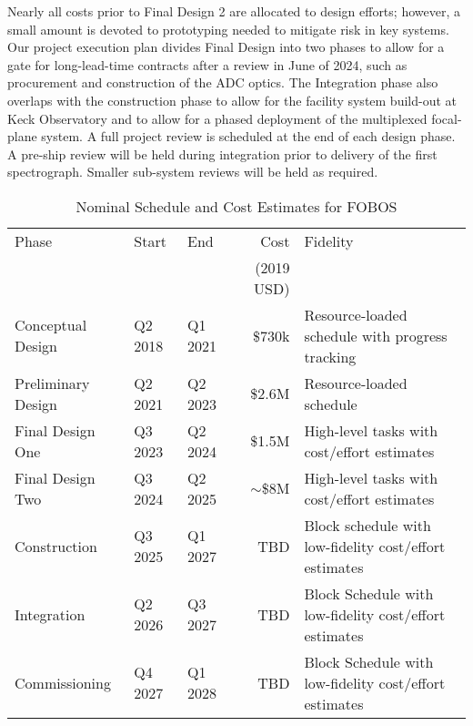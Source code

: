 Nearly all costs prior to Final Design 2 are allocated to design
efforts; however, a small amount is devoted to prototyping needed to
mitigate risk in key systems.  Our project execution plan divides Final
Design into two phases to allow for a gate for long-lead-time contracts
after a review in June of 2024, such as procurement and construction of
the ADC optics.  The Integration phase also overlaps with the
construction phase to allow for the facility system build-out at Keck
Observatory and to allow for a phased deployment of the multiplexed
focal-plane system.  A full project review is scheduled at the end of
each design phase.  A pre-ship review will be held during integration
prior to delivery of the first spectrograph.   Smaller sub-system
reviews will be held as required.

\begin{table}[h!]
\centering
\footnotesize
\caption{Nominal Schedule and Cost Estimates for FOBOS}
\label{tab:cost}
\vspace*{-10pt}
\begin{tabular}{l | l l r l }
\hline
Phase              &  Start  &     End &         Cost & Fidelity \\
                   &         &         &  (2019 USD) &  \\
\hline
\hline
Conceptual Design  & Q2 2018 & Q1 2021 &   \$730k & Resource-loaded schedule with progress tracking \\
Preliminary Design & Q2 2021 & Q2 2023 &  \$2.6M & Resource-loaded schedule \\
Final Design One   & Q3 2023 & Q2 2024 &  \$1.5M & High-level tasks with cost/effort estimates \\
Final Design Two   & Q3 2024 & Q2 2025 &  $\sim$\$8M & High-level tasks with cost/effort estimates \\
Construction       & Q3 2025 & Q1 2027 & TBD & Block schedule with low-fidelity cost/effort estimates \\
Integration        & Q2 2026 & Q3 2027 & TBD & Block Schedule with low-fidelity cost/effort estimates \\
Commissioning      & Q4 2027 & Q1 2028 &   TBD & Block Schedule with low-fidelity cost/effort estimates \\
\hline
\end{tabular}
\end{table}



